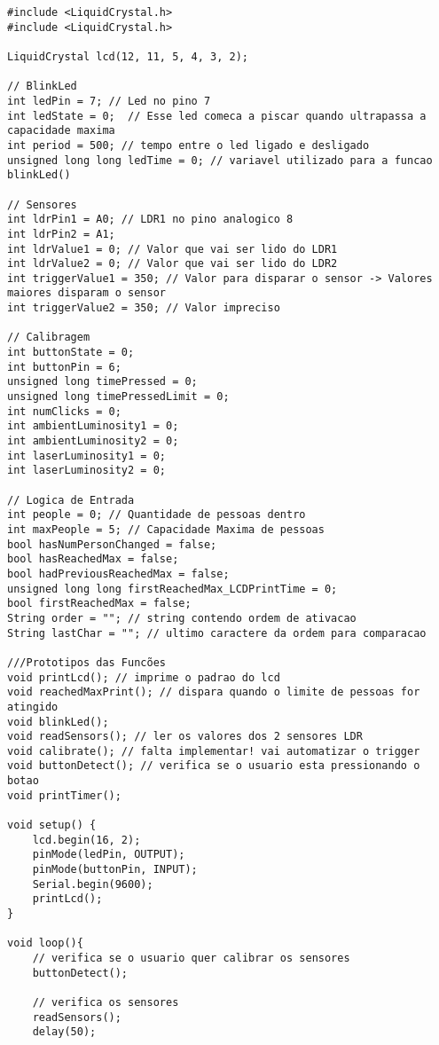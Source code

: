 \documentclass[10pt,twocolumn,letterpaper]{article}
\begin{document}

\begin{lstlisting}
#include <LiquidCrystal.h>
#include <LiquidCrystal.h>

LiquidCrystal lcd(12, 11, 5, 4, 3, 2);

// BlinkLed
int ledPin = 7; // Led no pino 7  
int ledState = 0;  // Esse led comeca a piscar quando ultrapassa a capacidade maxima
int period = 500; // tempo entre o led ligado e desligado
unsigned long long ledTime = 0; // variavel utilizado para a funcao blinkLed()

// Sensores
int ldrPin1 = A0; // LDR1 no pino analogico 8
int ldrPin2 = A1; 
int ldrValue1 = 0; // Valor que vai ser lido do LDR1
int ldrValue2 = 0; // Valor que vai ser lido do LDR2
int triggerValue1 = 350; // Valor para disparar o sensor -> Valores maiores disparam o sensor
int triggerValue2 = 350; // Valor impreciso 

// Calibragem
int buttonState = 0;
int buttonPin = 6;
unsigned long timePressed = 0;
unsigned long timePressedLimit = 0;
int numClicks = 0;
int ambientLuminosity1 = 0;
int ambientLuminosity2 = 0;
int laserLuminosity1 = 0;
int laserLuminosity2 = 0;

// Logica de Entrada
int people = 0; // Quantidade de pessoas dentro
int maxPeople = 5; // Capacidade Maxima de pessoas
bool hasNumPersonChanged = false;
bool hasReachedMax = false;
bool hadPreviousReachedMax = false;
unsigned long long firstReachedMax_LCDPrintTime = 0;
bool firstReachedMax = false;
String order = ""; // string contendo ordem de ativacao
String lastChar = ""; // ultimo caractere da ordem para comparacao

///Prototipos das Funcões
void printLcd(); // imprime o padrao do lcd
void reachedMaxPrint(); // dispara quando o limite de pessoas for atingido
void blinkLed();
void readSensors(); // ler os valores dos 2 sensores LDR
void calibrate(); // falta implementar! vai automatizar o trigger
void buttonDetect(); // verifica se o usuario esta pressionando o botao
void printTimer();

void setup() {
    lcd.begin(16, 2);
    pinMode(ledPin, OUTPUT);
    pinMode(buttonPin, INPUT);
    Serial.begin(9600);
    printLcd();
}

void loop(){
    // verifica se o usuario quer calibrar os sensores
    buttonDetect();

    // verifica os sensores
    readSensors();
    delay(50);


\end{lstlisting}
\end{document}
